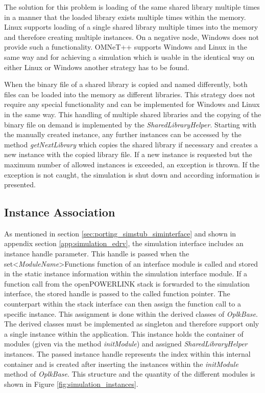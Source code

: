 The solution for this problem is loading of the same shared library multiple times in a manner that the loaded library exists multiple times within the memory.
Linux supports loading of a single shared library multiple times into the memory and therefore creating multiple instances.
On a negative node, Windows does not provide such a functionality.
OMNeT++ supports Windows and Linux in the same way and for achieving a simulation which is usable in the identical way on either Linux or Windows another strategy has to be found.

When the binary file of a shared library is copied and named differently, both files can be loaded into the memory as different libraries.
This strategy does not require any special functionality and can be implemented for Windows and Linux in the same way.
This handling of multiple shared libraries and the copying of the binary file on demand is implemented by the \emph{SharedLibraryHelper}.
Starting with the manually created instance, any further instances can be accessed by the method \emph{getNextLibrary} which copies the shared library if necessary and creates a new instance with the copied library file.
If a new instance is requested but the maximum number of allowed instances is exceeded, an exception is thrown.
If the exception is not caught, the simulation is shut down and according information is presented. %


\subsection{Instance Association}
\label{sec:porting_stack_instance_assoc}
As mentioned in section \ref{sec:porting_simstub_siminterface} and shown in appendix section \ref{app:simulation_edrv}, the simulation interface includes an instance handle parameter.
This handle is passed when the set<\emph{ModuleName}>Functions function of an interface module is called and stored in the static instance information within the simulation interface module.
If a function call from the openPOWERLINK stack is forwarded to the simulation interface, the stored handle is passed to the called function pointer.
The counterpart within the stack interface can then assign the function call to a specific instance.
This assignment is done within the derived classes of \emph{OplkBase}.
The derived classes must be implemented as singleton and therefore support only a single instance within the application.
This instance holds the container of modules (given via the method \emph{initModule}) and assigned \emph{SharedLibraryHelper} instances.
The passed instance handle represents the index within this internal container and is created after inserting the instances within the \emph{initModule} method of \emph{OplkBase}.
This structure and the quantity of the different modules is shown in Figure \ref{fig:simulation_instances}.

